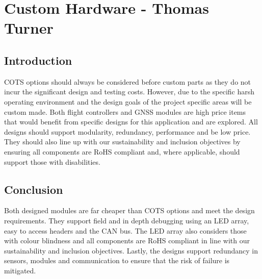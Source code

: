 \newpage
{}
\section{Custom Hardware - Thomas Turner} \label{section:Custom Hardware}
\subsection{Introduction}\label{sub_section:tgt_custom_hardware_intro}
\gls{COTS} options should always be considered before custom parts as they do not incur the significant design and testing costs. However, due to the specific harsh operating environment and the design goals of the project specific areas will be custom made. Both flight controllers and \gls{GNSS} modules are high price items that would benefit from specific designs for this application and are explored. All designs should support modularity, redundancy, performance and be low price. They should also line up with our sustainability and inclusion objectives by ensuring all components are \gls{RoHS} compliant and, where applicable, should support those with disabilities.





\subsection{Conclusion}
Both designed modules are far cheaper than \gls{COTS} options and meet the design requirements. They support field and in depth debugging using an \gls{LED} array, easy to access headers and the \gls{CAN} bus. The LED array also considers those with colour blindness and all components are \gls{RoHS} compliant in line with our sustainability and inclusion objectives. Lastly, the designs support redundancy in sensors, modules and communication to ensure that the risk of failure is mitigated.